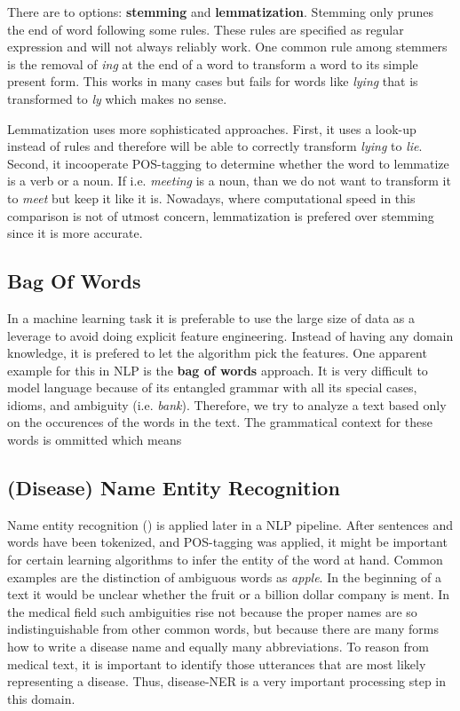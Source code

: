 There are to options: \textbf{stemming} and \textbf{lemmatization}. Stemming only prunes the end of word following some rules. These rules are specified as regular expression and will not always reliably work. One common rule among stemmers is the removal of \textit{ing} at the end of a word to transform a word to its simple present form. This works in many cases but fails for words like \textit{lying} that is transformed to \textit{ly} which makes no sense.

Lemmatization uses more sophisticated approaches. First, it uses a look-up instead of rules and therefore will be able to correctly transform \textit{lying} to \textit{lie}. Second, it incooperate POS-tagging to determine whether the word to lemmatize is a verb or a noun. If i.e. \textit{meeting} is a noun, than we do not want to transform it to \textit{meet} but keep it like it is. Nowadays, where computational speed in this comparison is not of utmost concern, lemmatization is prefered over stemming since it is more accurate.


\subsection{Bag Of Words}
In a machine learning task it is preferable to use the large size of data as a leverage to avoid
doing explicit feature engineering. Instead of having any domain knowledge, it is prefered to let the algorithm pick the features. One apparent example for this in NLP is the \textbf{bag of words} approach. It is very difficult to model language because of its entangled grammar with all its special cases, idioms, and ambiguity (i.e. \textit{bank}). Therefore, we try to analyze a text based only on the occurences of the words in the text. The grammatical context for these words is ommitted which means

\subsection{(Disease) Name Entity Recognition}
Name entity recognition () is applied later in a NLP pipeline. After
sentences and words have been tokenized, and POS-tagging was applied, it might be important for certain learning algorithms to
infer the entity of the word at hand. Common examples are the distinction of
ambiguous words as \textit{apple}. In the beginning of a text it would be unclear whether the fruit or a billion dollar company is ment. In the medical field such ambiguities rise not because the proper names are so
indistinguishable from other common words, but because there are many forms
how to write a disease name and equally many abbreviations. To reason from medical text, it is important to identify those utterances that are most likely representing a disease. Thus, disease-NER is a very important processing step in this domain.

